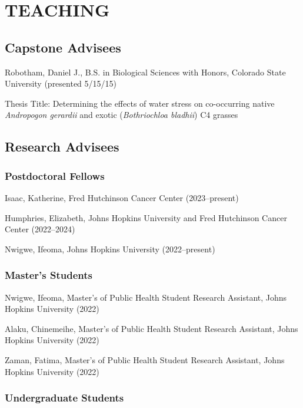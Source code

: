 \documentclass{cv}
\begin{document}

\section*{TEACHING}


\subsection*{Capstone Advisees}

Robotham, Daniel J., B.S. in Biological Sciences with Honors, Colorado State University (presented 5/15/15)

Thesis Title: Determining the effects of water stress on co-occurring native \textit{Andropogon gerardii} and exotic (\textit{Bothriochloa bladhii}) C4 grasses

\subsection*{Research Advisees}

\subsubsection*{Postdoctoral Fellows}

Isaac, Katherine, Fred Hutchinson Cancer Center (2023--present)

Humphries, Elizabeth, Johns Hopkins University and Fred Hutchinson Cancer Center (2022--2024)

Nwigwe, Ifeoma, Johns Hopkins University (2022--present)

\subsubsection*{Master's Students}

Nwigwe, Ifeoma, Master's of Public Health Student Research Assistant, Johns Hopkins University (2022)

Alaku, Chinemeihe, Master's of Public Health Student Research Assistant, Johns Hopkins University (2022)

Zaman, Fatima, Master's of Public Health Student Research Assistant, Johns Hopkins University (2022)

\subsubsection*{Undergraduate Students}
\end{document}
